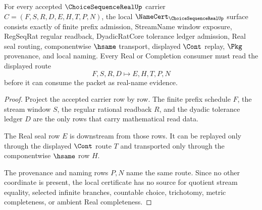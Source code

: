\begin{theorem}
\label{thm:choice-sequence-real-namecert-obligations}
For every accepted $\ChoiceSequenceRealUp$ carrier $C=(F,S,R,D,E,H,T,P,N)$, the local $\NameCert_{\ChoiceSequenceRealUp}$ surface consists exactly of finite prefix admission, StreamName window exposure, RegSeqRat regular readback, DyadicRatCore tolerance ledger admission, Real seal routing, componentwise $\hsame$ transport, displayed $\Cont$ replay, $\Pkg$ provenance, and local naming. Every Real or Completion consumer must read the displayed route
$$
F,S,R,D \longmapsto E,H,T,P,N
$$
before it can consume the packet as real-name evidence.
\end{theorem}
\begin{proof}
Project the accepted carrier row by row. The finite prefix schedule $F$, the stream window $S$, the regular rational readback $R$, and the dyadic tolerance ledger $D$ are the only rows that carry mathematical read data.

The Real seal row $E$ is downstream from those rows. It can be replayed only through the displayed $\Cont$ route $T$ and transported only through the componentwise $\hsame$ row $H$.

The provenance and naming rows $P,N$ name the same route. Since no other coordinate is present, the local certificate has no source for quotient stream equality, selected infinite branches, countable choice, trichotomy, metric completeness, or ambient Real completeness.
\end{proof}

